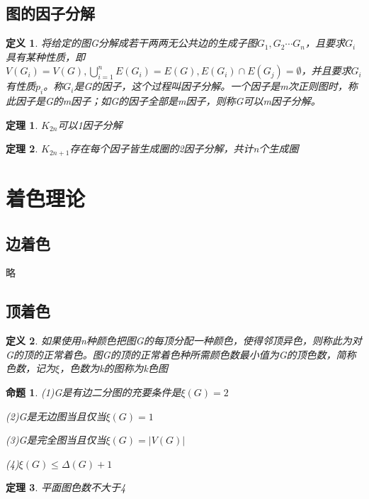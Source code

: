 \documentclass[UTF8]{ctexart}
\newtheorem{dfnt}{定义}
\newtheorem{thr}{定理}
\newtheorem{pro}{命题}
\begin{document}
\subsection{图的因子分解}
\begin{dfnt}
将给定的图G分解成若干两两无公共边的生成子图$G_1,G_2\cdots G_n$，且要求$G_i$具有某种性质，即$V(G_i)=V(G),\bigcup \limits_{i=1}^{n}E(G_i)=E(G),E(G_i) \cap E(G_j) = \emptyset$，并且要求$G_i$有性质$p_i$。称$G_i$是G的因子，这个过程叫因子分解。一个因子是m次正则图时，称此因子是G的m因子；如G的因子全部是m因子，则称G可以m因子分解。
\end{dfnt}
\begin{thr}
$K_{2n}$可以1因子分解
\end{thr}
\begin{thr}
$K_{2n+1}$存在每个因子皆生成圈的2因子分解，共计n个生成圈
\end{thr}

\section{着色理论}
\subsection{边着色}
略
\subsection{顶着色}
\begin{dfnt}
如果使用n种颜色把图G的每顶分配一种颜色，使得邻顶异色，则称此为对G的顶的正常着色。图G的顶的正常着色种所需颜色数最小值为G的顶色数，简称色数，记为$\xi$，色数为k的图称为k色图
\end{dfnt}
\begin{pro}
\item (1)G是有边二分图的充要条件是$\xi (G)=2$
\item (2)G是无边图当且仅当$\xi (G)=1$
\item (3)G是完全图当且仅当$\xi (G)=|V(G)|$
\item (4)$\xi (G) \leq \Delta (G)+1$
\end{pro}
\begin{thr}
平面图色数不大于4
\end{thr}
\end{document}
